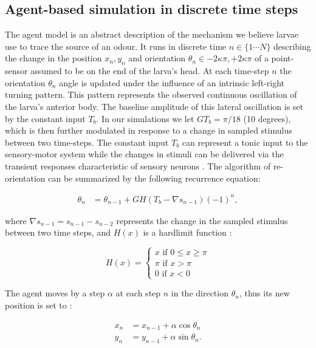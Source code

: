 \documentclass[11pt,a4paper]{article}
\begin{document}
\subsection{Agent-based simulation in discrete time steps}
\label{sec:methodsDiscreteAgent}
The agent model is an abstract description of the mechanism we believe larvae use to trace the source of an odour. It runs in discrete time $n \in \{1 \cdots N\}$ describing the change in the position $x_n,y_n$ and orientation $\theta_n \in {-2 \kappa \pi,+2 \kappa \pi}$ of a point-sensor assumed to be on the end of the larva's head. At each time-step $n$ the orientation $\theta_n$ angle is updated under the influence of an intrinsic left-right turning pattern. This pattern represents the observed continuous oscillation of the larva's anterior body. The baseline amplitude of this lateral oscillation is set by the constant input $T_b$. In our simulations we let $G T_b = \pi/18$ (10 degrees), which is then further modulated in response to a change in sampled stimulus between two time-steps. The constant input $T_b$ can represent a tonic input to the sensory-motor system while the changes in stimuli can be delivered via the transient responses characteristic of sensory neurons \citep{nagel2011biophysical}.
The algorithm of re-orientation can be summarized by the following recurrence equation:

\begin{align}
\theta_n &= \theta_{n-1} + G H(T_b - \nabla s_{n-1}){(-1)}^n,
\label{eqn:Discretemodel}
\end{align}

where  $\nabla s_{n-1}  = s_{n-1} - s_{n-2}$ represents the change in the sampled stimulus between two time steps, and $H(x)$ is a hardlimit function :

\begin{equation}
H(x) =
\begin{cases}
x \mbox{ if } 0 \leq x \geq \pi \\
\pi \mbox{ if } x > \pi  \\
0 \mbox{ if } x < 0 
\end{cases}
\end{equation}

The agent moves by a step $\alpha$ at each step $n$ in the direction $\theta_n$, thus its new position is set to :

\begin{align}
x_n &= x_{n-1}+ \alpha \cos \theta_{n} \\
y_n &= y_{n-1}+ \alpha  \sin \theta_{n}.
\end{align}
\end{document}
